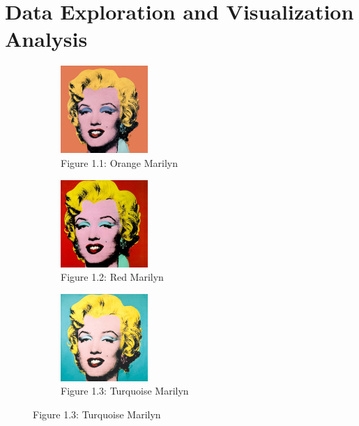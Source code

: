 \documentclass{article}
\begin{document}
\hypertarget{data-exploration-and-visualization-analysis}{%
\section{Data Exploration and Visualization
Analysis}\label{data-exploration-and-visualization-analysis}}

\begin{figure}[ht]
  \centering
  \begin{subfigure}{0.3\textwidth}
    \centering
    \includegraphics[width=125px]{main_files/figure-latex/1_1_orange_marilyn.jpg}
    \caption{Figure 1.1: Orange Marilyn}
    \label{fig:1_1_orange_marilyn}
  \end{subfigure}
  \hfill
  \begin{subfigure}{0.3\textwidth}
    \centering
    \includegraphics[width=125px]{main_files/figure-latex/1_2_red_marilyn.jpg}
    \caption{Figure 1.2: Red Marilyn}
    \label{fig:1_2_red_marilyn}
  \end{subfigure}
  \hfill
  \begin{subfigure}{0.3\textwidth}
    \centering
    \includegraphics[width=125px]{main_files/figure-latex/1_3_turq_marilyn.jpg}
    \caption{Figure 1.3: Turquoise Marilyn}
    \label{fig:1_3_turq_marilyn}
  \end{subfigure}

  \vspace{1em} %


\end{figure}
\end{document}
